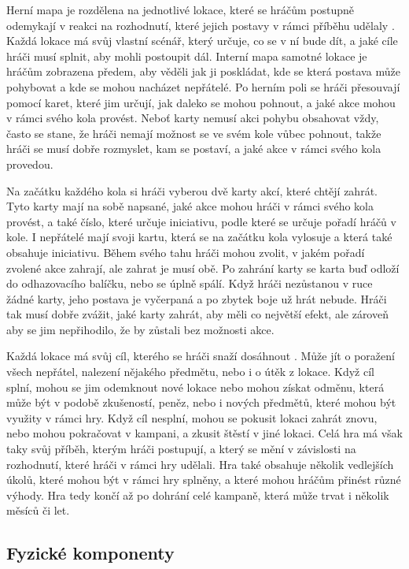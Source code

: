 Herní mapa je rozdělena na jednotlivé lokace, které se hráčům postupně odemykají v reakci na rozhodnutí, které jejich postavy v rámci příběhu udělaly . Každá lokace má svůj vlastní scénář, který určuje, co se v ní bude dít, a jaké cíle hráči musí splnit, aby mohli postoupit dál. Interní mapa samotné lokace je hráčům zobrazena předem, aby věděli jak ji poskládat, kde se která postava může pohybovat a kde se mohou nacházet nepřátelé. Po herním poli se hráči přesouvají pomocí karet, které jim určují, jak daleko se mohou pohnout, a jaké akce mohou v rámci svého kola provést. Neboť karty nemusí akci pohybu obsahovat vždy, často se stane, že hráči nemají možnost se ve svém kole vůbec pohnout, takže hráči se musí dobře rozmyslet, kam se postaví, a jaké akce v rámci svého kola provedou.

Na začátku každého kola si hráči vyberou dvě karty akcí, které chtějí zahrát. Tyto karty mají na sobě napsané, jaké akce mohou hráči v rámci svého kola provést, a také číslo, které určuje iniciativu, podle které se určuje pořadí hráčů v kole. I nepřátelé mají svoji kartu, která se na začátku kola vylosuje a která také obsahuje iniciativu. Během svého tahu hráči mohou zvolit, v jakém pořadí zvolené akce zahrají, ale zahrat je musí obě. Po zahrání karty se karta buď odloží do odhazovacího balíčku, nebo se úplně spálí. Když hráči nezůstanou v ruce žádné karty, jeho postava je vyčerpaná a po zbytek boje už hrát nebude. Hráči tak musí dobře zvážit, jaké karty zahrát, aby měli co největší efekt, ale zároveň aby se jim nepřihodilo, že by zůstali bez možnosti akce.

Každá lokace má svůj cíl, kterého se hráči snaží dosáhnout . Může jít o poražení všech nepřátel, nalezení nějakého předmětu, nebo i o útěk z lokace. Když cíl splní, mohou se jim odemknout nové lokace nebo mohou získat odměnu, která může být v podobě zkušeností, peněz, nebo i nových předmětů, které mohou být využity v rámci hry. Když cíl nesplní, mohou se pokusit lokaci zahrát znovu, nebo mohou pokračovat v kampani, a zkusit štěstí v jiné lokaci. Celá hra má však taky svůj příběh, kterým hráči postupují, a který se mění v závislosti na rozhodnutí, které hráči v rámci hry udělali. Hra také obsahuje několik vedlejších úkolů, které mohou být v rámci hry splněny, a které mohou hráčům přinést různé výhody. Hra tedy končí až po dohrání celé kampaně, která může trvat i několik měsíců či let.

\subsection{Fyzické komponenty}
\label{subsec:gh_components}


